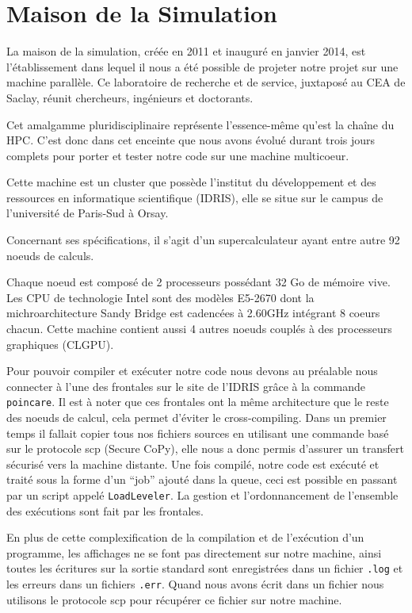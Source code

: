 \section{Maison de la Simulation}

La maison de la simulation,
créée en 2011 et inauguré en janvier 2014,
est l'établissement dans lequel il nous a été possible
de projeter notre projet sur une machine parallèle.
Ce laboratoire de recherche et de service,
juxtaposé au CEA de Saclay,
réunit chercheurs, ingénieurs et doctorants.

Cet amalgamme pluridisciplinaire représente
l'essence-même qu'est la chaîne du HPC.
C'est donc dans cet enceinte que nous avons évolué
durant trois jours complets pour porter et tester notre
code sur une machine multicoeur.

Cette machine est un cluster que possède
l'institut du développement et des ressources en
informatique scientifique (IDRIS),
elle se situe sur le campus de l'université de Paris-Sud à Orsay.

Concernant ses spécifications, il s'agit d'un supercalculateur
ayant entre autre 92 noeuds de calculs.

Chaque noeud est composé de 2 processeurs possédant
32 Go de mémoire vive.
Les CPU de technologie Intel sont des modèles E5-2670
dont la michroarchitecture Sandy Bridge est
cadencées à 2.60GHz intégrant 8 coeurs chacun.
Cette machine contient aussi 4 autres noeuds
couplés à des processeurs graphiques (CLGPU).

Pour pouvoir compiler et exécuter notre code
nous devons au préalable nous connecter à
l'une des frontales sur le site de l'IDRIS
grâce à la commande {\tt poincare}.
Il est à noter que ces frontales ont la même architecture
que le reste des noeuds de calcul,
cela permet d'éviter le cross-compiling.
Dans un premier temps il fallait copier tous nos fichiers sources
en utilisant une commande basé sur le protocole scp (Secure CoPy),
elle nous a donc permis d'assurer un transfert sécurisé
vers la machine distante.
Une fois compilé, notre code est exécuté et traité sous la forme
d'un ``job'' ajouté dans la queue,
ceci est possible en passant par un script appelé {\tt LoadLeveler}.
La gestion et l'ordonnancement de l'ensemble des exécutions sont
fait par les frontales.

En plus de cette complexification de la compilation
et de l'exécution d'un programme,
les affichages ne se font pas directement sur notre machine,
ainsi toutes les écritures sur la sortie standard sont
enregistrées dans un fichier {\tt .log}
et les erreurs dans un fichiers {\tt .err}.
Quand nous avons écrit dans un fichier nous utilisons
le protocole scp pour récupérer ce fichier sur notre machine.



